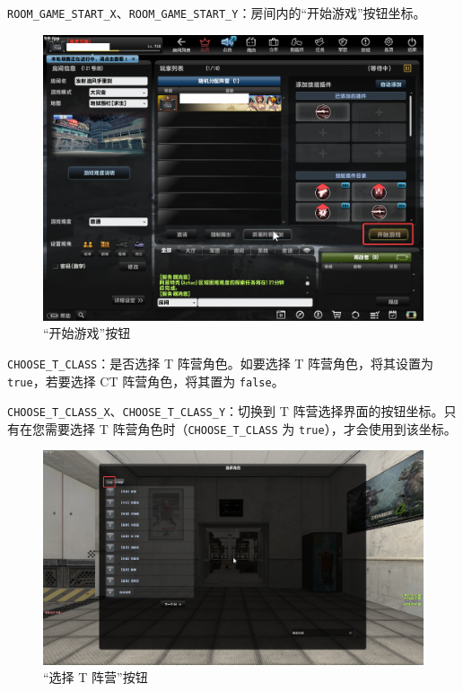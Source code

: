 \lstinline{ROOM_GAME_START_X}、\lstinline{ROOM_GAME_START_Y}：房间内的“开始游戏”按钮坐标。

\begin{figure}[H]
    \Centering
    \includegraphics[width=\textwidth]{docs/assets/start_game.png}
    \caption{“开始游戏”按钮}
\end{figure}

\lstinline{CHOOSE_T_CLASS}：是否选择 T 阵营角色。如要选择 T 阵营角色，将其设置为 \lstinline{true}，若要选择 CT 阵营角色，将其置为 \lstinline{false}。

\lstinline{CHOOSE_T_CLASS_X}、\lstinline{CHOOSE_T_CLASS_Y}：切换到 T 阵营选择界面的按钮坐标。只有在您需要选择 T 阵营角色时（\lstinline{CHOOSE_T_CLASS} 为 \lstinline{true}），才会使用到该坐标。

\begin{figure}[H]
    \Centering
    \includegraphics[width=\textwidth]{docs/assets/choose_T_class.png}
    \caption{“选择 T 阵营”按钮}
\end{figure}

